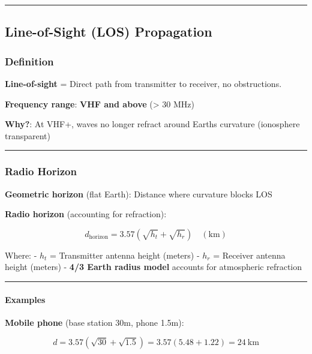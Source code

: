 \begin{center}\rule{0.5\linewidth}{0.5pt}\end{center}

\subsection{Line-of-Sight (LOS)
Propagation}\label{line-of-sight-los-propagation}

\subsubsection{Definition}\label{definition-2}

\textbf{Line-of-sight} = Direct path from transmitter to receiver, no
obstructions.

\textbf{Frequency range}: \textbf{VHF and above} (\textgreater{} 30 MHz)

\textbf{Why?}: At VHF+, waves no longer refract around
Earth\textquotesingle s curvature (ionosphere transparent)

\begin{center}\rule{0.5\linewidth}{0.5pt}\end{center}

\subsubsection{Radio Horizon}\label{radio-horizon}

\textbf{Geometric horizon} (flat Earth): Distance where curvature blocks
LOS

\textbf{Radio horizon} (accounting for refraction):

\[
d_{\text{horizon}} = 3.57(\sqrt{h_t} + \sqrt{h_r}) \quad (\text{km})
\]

Where: - \(h_t\) = Transmitter antenna height (meters) - \(h_r\) =
Receiver antenna height (meters) - \textbf{4/3 Earth radius model}
accounts for atmospheric refraction

\begin{center}\rule{0.5\linewidth}{0.5pt}\end{center}

\paragraph{Examples}\label{examples}

\textbf{Mobile phone} (base station 30m, phone 1.5m):

\[
d = 3.57(\sqrt{30} + \sqrt{1.5}) = 3.57(5.48 + 1.22) = 24\ \text{km}
\]

